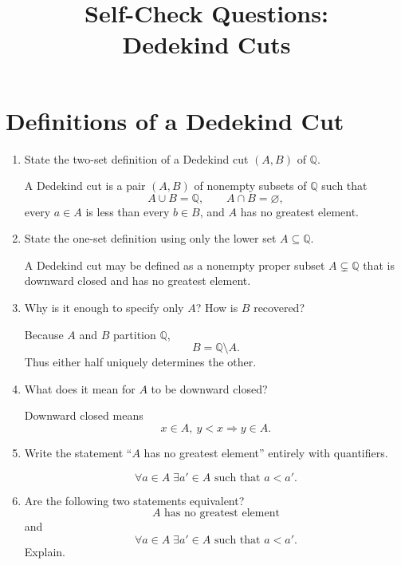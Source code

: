 \documentclass{self-check}
\title{Self-Check Questions:\\Dedekind Cuts}
\author{}
\date{}
\begin{document}
\maketitle
\tableofcontents
\newpage

\section{Definitions of a Dedekind Cut}

\begin{enumerate}[label=\arabic{*}., itemsep=10pt]
  \item State the two-set definition of a Dedekind cut \((A,B)\) of \(\mathbb{Q}\).

    \begin{answer}
      A Dedekind cut is a pair \((A,B)\) of nonempty subsets of \(\mathbb{Q}\) such that
      \[ A\cup B=\mathbb{Q},\qquad A\cap B=\varnothing, \]
      every \(a\in A\) is less than every \(b\in B\), and \(A\) has no greatest element.
    \end{answer}
  \item State the one-set definition using only the lower set \(A\subseteq\mathbb{Q}\).

    \begin{answer}
      A Dedekind cut may be defined as a nonempty proper subset \(A\subsetneq\mathbb{Q}\) that is downward closed and has no greatest element.
    \end{answer}
  \item Why is it enough to specify only \(A\)? How is \(B\) recovered?

    \begin{answer}
      Because \(A\) and \(B\) partition \(\mathbb{Q}\),
      \[ B=\mathbb{Q}\setminus A. \]
      Thus either half uniquely determines the other.
    \end{answer}
  \item What does it mean for \(A\) to be downward closed?

    \begin{answer}
      Downward closed means
      \[ x\in A,\ y<x \Longrightarrow y\in A. \]
    \end{answer}
  \item Write the statement ``\(A\) has no greatest element'' entirely with quantifiers.

    \begin{answer}
      \[ \forall a\in A\;\exists a'\in A\text{ such that }a<a'. \]
    \end{answer}
  \item Are the following two statements equivalent?
    \[
      \text{\(A\) has no greatest element}
    \]
    and
    \[ \forall a\in A\;\exists a'\in A\text{ such that }a<a'. \]
    Explain.


\end{enumerate}
\end{document}
